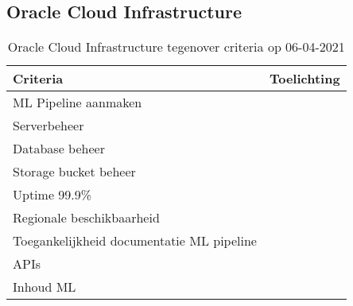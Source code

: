 \subsection*{Oracle Cloud Infrastructure}\label{appendix:detailed-overview-of-cloud-computing-platforms:oracle-cloud-infrastructure}
\begin{table}[hbt!]
  \centering
  \begin{tabular}{|p{.2\linewidth}|p{.74\linewidth}|}
  \hline
  \textbf{Criteria} & \textbf{Toelichting} \\ \hline
    ML Pipeline \newline aanmaken
    &

    \\ \hline

    Serverbeheer
    &

    \\ \hline

    Database beheer
    &

    \\ \hline

    Storage \newline bucket beheer
    &

    \\ \hline

    Uptime 99.9\%
    &

    \\ \hline

    Regionale \newline beschikbaarheid
    &

    \\ \hline

    Toegankelijkheid documentatie ML pipeline
    &

    \\ \hline

    APIs
    &

    \\ \hline

    Inhoud ML
    &

    \\ \hline
  \end{tabular}
  \caption{Oracle Cloud Infrastructure tegenover criteria op 06-04-2021}
  \label{table:oracle-cloud-infrastructure-against-criteria}
\end{table}

\newpage

